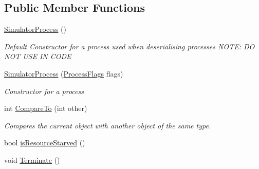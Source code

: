 \subsection*{Public Member Functions}
\begin{DoxyCompactItemize}
\item 
\hyperlink{class_c_p_u___o_s___simulator_1_1_operating___system_1_1_simulator_process_a6d9429aba3440d2bde6e8733eeee232f}{Simulator\+Process} ()
\begin{DoxyCompactList}\small\item\em Default Constructor for a process used when deserialising processes N\+O\+T\+E\+: D\+O N\+O\+T U\+S\+E I\+N C\+O\+D\+E \end{DoxyCompactList}\item 
\hyperlink{class_c_p_u___o_s___simulator_1_1_operating___system_1_1_simulator_process_a30b212f64f058e2f2c06936f8f63a492}{Simulator\+Process} (\hyperlink{struct_c_p_u___o_s___simulator_1_1_operating___system_1_1_process_flags}{Process\+Flags} flags)
\begin{DoxyCompactList}\small\item\em Constructor for a process \end{DoxyCompactList}\item 
int \hyperlink{class_c_p_u___o_s___simulator_1_1_operating___system_1_1_simulator_process_a49923ce9c64c06e2cf9720d845246603}{Compare\+To} (int other)
\begin{DoxyCompactList}\small\item\em Compares the current object with another object of the same type. \end{DoxyCompactList}\item 
bool \hyperlink{class_c_p_u___o_s___simulator_1_1_operating___system_1_1_simulator_process_a742a1d9b4aeb3eabc4325ffa6254af23}{is\+Resource\+Starved} ()
\item 
void \hyperlink{class_c_p_u___o_s___simulator_1_1_operating___system_1_1_simulator_process_a5dca50120b8fdbb688040531091e9ac0}{Terminate} ()
\end{DoxyCompactItemize}
